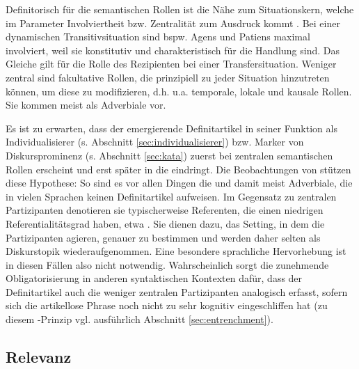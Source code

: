 Definitorisch für die semantischen Rollen ist die Nähe zum Situationskern, welche im Parameter Involviertheit bzw. Zentralität zum Ausdruck kommt \parencite[6]{Lehmann2004a}. Bei einer dynamischen Transitivsituation sind bspw. Agens und Patiens maximal involviert, weil sie konstitutiv und charakteristisch für die Handlung sind. Das Gleiche gilt für die Rolle des Rezipienten bei einer Transfersituation. Weniger zentral sind fakultative Rollen, die prinzipiell zu jeder Situation hinzutreten können, um diese zu modifizieren, d.h. u.a. temporale, lokale und kausale Rollen. Sie kommen  meist als Adverbiale vor.

Es ist zu erwarten, dass der emergierende Definitartikel in seiner Funktion als Individualisierer (s. Abschnitt \ref{sec:individualisierer}) bzw. Marker von Diskursprominenz (s. Abschnitt \ref{sec:kata}) zuerst bei zentralen semantischen Rollen erscheint und erst später in die  eindringt. Die Beobachtungen von \textcite{Himmelmann1998} stützen diese Hypothese: So sind es vor allen Dingen die  und damit meist Adverbiale, die in vielen Sprachen keinen Definitartikel aufweisen. Im Gegensatz zu zentralen Partizipanten denotieren sie typischerweise Referenten, die einen niedrigen Referentialitätsgrad haben, etwa .  Sie dienen dazu, das Setting, in dem die Partizipanten agieren, genauer zu bestimmen \parencite["-="- orientierende Funktion, s.][118]{Himmelmann1997} und werden daher selten als Diskurstopik wiederaufgenommen. Eine besondere sprachliche Hervorhebung ist in diesen Fällen also nicht notwendig. Wahrscheinlich sorgt die zunehmende Obligatorisierung in anderen syntaktischen Kontexten dafür, dass der Definitartikel auch die weniger zentralen Partizipanten analogisch erfasst, sofern sich die artikellose Phrase noch nicht zu sehr kognitiv eingeschliffen hat (zu diesem -Prinzip vgl. ausführlich Abschnitt \ref{sec:entrenchment}). 

\subsection{Relevanz}\label{sec:relevanz}

